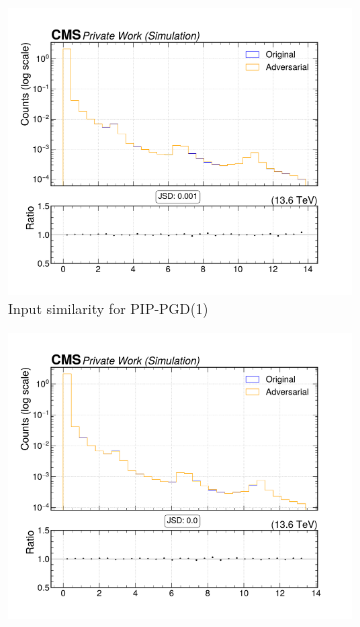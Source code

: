 \begin{figure}[htbp]
  \centering
  \begin{subfigure}[t]{0.32\textwidth}
    \includegraphics[width=\linewidth]{media/output/features/compare/combined_it_1/cmp_vtx_arr_sv_dxy.pdf}
    \caption*{Input similarity for PIP-PGD(1)}
  \end{subfigure}\hfill
  \begin{subfigure}[t]{0.32\textwidth}
    \includegraphics[width=\linewidth]{media/output/features/compare/combined_it_2/cmp_vtx_arr_sv_dxy.pdf}

\end{subfigure}
\end{figure}
